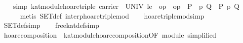 \begin{isabellebody}
\endisatagproof
{\isafoldproof}%
%
\isadelimproof
\isanewline
%
\endisadelimproof
\isanewline
\ \ \isamarkupfalse%
\ {}simp{}{}\ {}kat{}module{}hoare{}triple\ {}carrier\ {}\ UNIV{}\ le\ {}\ op\ {}{}\ op\ {}\ P\ \ p\ Q\ {}\ {}P{}\ p\ {}Q{}{}\isanewline
%
\isadelimproof
\ \ \ \ %
\endisadelimproof
%
\isatagproof
{}\isamarkupfalse%
\ {}metis\ SET{}def\ interp{}hoare{}triple{}mod{}%
\endisatagproof
{\isafoldproof}%
%
\isadelimproof
\isanewline
%
\endisadelimproof
\isanewline
\ \ \isamarkupfalse%
\ hoare{}triple{}mod{}simp{}\isanewline
\ \ \isamarkupfalse%
\ SET{}def{}simp{}\isanewline
\ \ \isamarkupfalse%
\ free{}kat{}def{}simp{}\isanewline
\isanewline
\ \ \isamarkupfalse%
\ hoare{}composition\ {}\ kat{}module{}hoare{}composition{}OF\ module{}\ simplified{}\isanewline
\isanewline
\ \ \isamarkupfalse%

\end{isabellebody}

